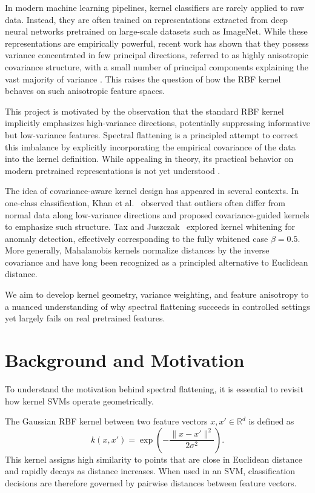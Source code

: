 \documentclass{article}
\begin{document}
In modern machine learning pipelines, kernel classifiers are rarely applied to raw data. Instead, they are often trained on representations extracted from deep neural networks pretrained on large-scale datasets such as ImageNet. While these representations are empirically powerful, recent work has shown that they possess variance concentrated in few principal directions, referred to as highly anisotropic covariance structure, with a small number of principal components explaining the vast majority of variance \cite{papyan2020prevalence}. This raises the question of how the RBF kernel behaves on such anisotropic feature spaces.

This project is motivated by the observation that the standard RBF kernel implicitly emphasizes high-variance directions, potentially suppressing informative but low-variance features. Spectral flattening is a principled attempt to correct this imbalance by explicitly incorporating the empirical covariance of the data into the kernel definition. While appealing in theory, its practical behavior on modern pretrained representations is not yet understood \cite{papyan2020prevalence}.

The idea of covariance-aware kernel design has appeared in several contexts. In one-class classification, Khan et al.~\cite{khan2014covariance} observed that outliers often differ from normal data along low-variance directions and proposed covariance-guided kernels to emphasize such structure. Tax and Juszczak~\cite{tax2002kernel} explored kernel whitening for anomaly detection, effectively corresponding to the fully whitened case $\beta=0.5$. More generally, Mahalanobis kernels normalize distances by the inverse covariance and have long been recognized as a principled alternative to Euclidean distance.

We aim to develop kernel geometry, variance weighting, and feature anisotropy to a nuanced understanding of why spectral flattening succeeds in controlled settings yet largely fails on real pretrained features.

\section{Background and Motivation}

To understand the motivation behind spectral flattening, it is essential to revisit how kernel SVMs operate geometrically.

The Gaussian RBF kernel between two feature vectors $x, x' \in \mathbb{R}^d$ is defined as
\[
k(x, x') = \exp\left(-\frac{\|x - x'\|^2}{2\sigma^2}\right).
\]
This kernel assigns high similarity to points that are close in Euclidean distance and rapidly decays as distance increases. When used in an SVM, classification decisions are therefore governed by pairwise distances between feature vectors.
\end{document}
